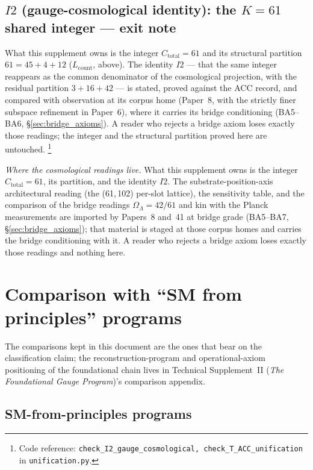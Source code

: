 \documentclass[11pt]{article}
\theoremstyle{definition}
\newcommand{\coderef}[2]{\footnote{Code reference: \texttt{#1} in \texttt{#2}.}}
\newcommand{\TSII}{Technical Supplement~II (\emph{The Foundational Gauge Program})}
\begin{document}
\subsection{$I2$ (gauge-cosmological identity): the $K = 61$ shared integer --- exit note}\label{sec:I2_at_L_count}

What this supplement owns is the integer $C_{\mathrm{total}} = 61$
and its structural partition $61 = 45 + 4 + 12$
($L_{\mathrm{count}}$, above).  The identity $I2$ --- that the same
integer reappears as the common denominator of the cosmological
projection, with the residual partition $3 + 16 + 42$ --- is stated,
proved against the ACC record, and compared with observation at its
corpus home (Paper~8, with the strictly finer subspace refinement in
Paper~6), where it carries its bridge conditioning (BA5--BA6,
\S\ref{sec:bridge_axioms}).  A reader who rejects a bridge axiom
loses exactly those readings; the integer and the structural
partition proved here are untouched.
\coderef{check\_I2\_gauge\_cosmological, check\_T\_ACC\_unification}{unification.py}


\smallskip\noindent\textit{Where the cosmological readings live.}\quad
What this supplement owns is the integer $C_{\mathrm{total}} = 61$,
its partition, and the identity $I2$.  The substrate-position-axis
architectural reading (the (61,\,102) per-slot lattice), the
sensitivity table, and the comparison of the bridge readings
$\Omega_\Lambda = 42/61$ and kin with the Planck measurements are
imported by Papers~8 and~41 at bridge grade (BA5--BA7,
\S\ref{sec:bridge_axioms}); that material is staged at those corpus
homes and carries the bridge conditioning with it.  A reader who
rejects a bridge axiom loses exactly those readings and nothing here.


\newpage

\appendix


\section{Comparison with ``SM from principles'' programs}
\label{app:literature}

The comparisons kept in this document are the ones that bear on the
classification claim; the reconstruction-program and
operational-axiom positioning of the foundational chain lives in
\TSII's comparison appendix.

\subsection{SM-from-principles programs}
\label{sec:sm_programs}
\end{document}
